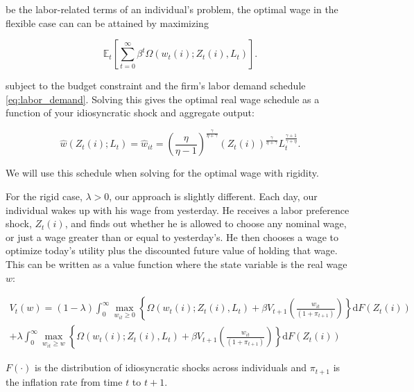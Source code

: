 \documentclass[12pt,a4paper]{scrartcl}            %
\begin{document}
be the labor-related terms of an individual's problem, the optimal wage in the flexible case can can be attained by maximizing

\begin{equation}
    \label{eq:labor_opt}
    \mathbb{E}_t\left[\sum_{t=0}^{\infty}\beta^t \Omega( w_t(i); Z_t(i), L_t ) \right].
\end{equation}

subject to the budget constraint and the firm's labor demand schedule \ref{eq:labor_demand}.
Solving this gives the optimal real wage schedule as a function of your idiosyncratic shock and aggregate output:

\begin{equation}
    \label{eq:flex}
    \hat{w}(Z_t(i); L_t) = \hat{w}_{it} = \left( \frac{\eta}{\eta - 1} \right)^{\frac{\gamma}{\eta + \gamma}}\left( Z_t(i) \right)^{\frac{\gamma}{\eta + \gamma}} L_t^{\frac{\gamma + 1}{\gamma + \eta}}.
\end{equation}

We will use this schedule when solving for the optimal wage with rigidity.  %

For the rigid case, $\lambda > 0$, our approach is slightly different.
Each day, our individual wakes up with his wage from yesterday.
He receives a labor preference shock, $Z_t(i)$, and finds out whether he is allowed to choose any nominal wage, or just a wage greater than or equal to yesterday's.
He then chooses a wage to optimize today's utility plus the discounted future value of holding that wage.
This can be written as a value function where the state variable is the real wage $w$:

\begin{multline}
    \label{eq:value_function}
    V_t(w) = (1 - \lambda) \int_{0}^{\infty} \max_{w_{it} \geq 0} \left\{ \Omega( w_t(i); Z_t(i), L_t ) + \beta V_{t+1}\left( \frac{w_{it}}{(1 + \pi_{t+1})} \right) \right\} \mathrm{d}F(Z_t(i)) \\
                + \lambda  \int_{0}^{\infty} \max_{w_{it} \geq w} \left\{ \Omega( w_t(i); Z_t(i), L_t ) + \beta V_{t+1}\left( \frac{w_{it}}{(1 + \pi_{t+1})} \right) \right\} \mathrm{d}F(Z_t(i))
\end{multline}

$F(\cdot)$ is the distribution of idiosyncratic shocks across individuals and $\pi_{t+1}$ is the inflation rate from time $t$ to $t+1$.
\end{document}
